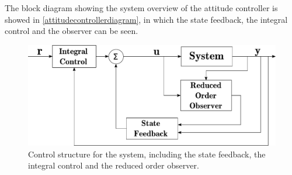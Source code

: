 The block diagram showing the system overview of the attitude controller is showed in \autoref{attitudecontrollerdiagram}, in which the state feedback, the integral control and the observer can be seen.
\begin{figure}[H]
	\includegraphics[scale=.5]{figures/AttitudeControlDiagram}
	\centering
	\caption{Control structure for the system, including the state feedback, the integral control and the reduced order observer.}
	\label{attitudecontrollerdiagram}
\end{figure}


